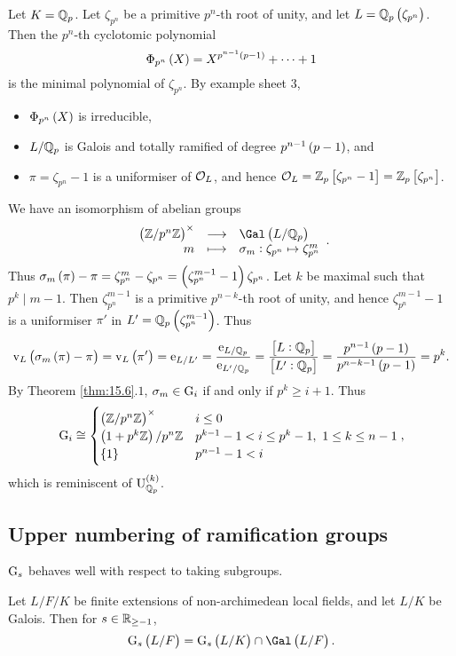 \begin{example*}
Let $ K = \mathbb{Q}_p $. Let $ \zeta_{p^n} $ be a primitive $ p^n $-th root of unity, and let $ L = \QQ_p\br{\zeta_{p^n}} $. Then the $ p^n $-th cyclotomic polynomial
$$ \Phi_{p^n}\br{X} = X^{p^{n - 1}\br{p - 1}} + \dots + 1 $$
is the minimal polynomial of $ \zeta_{p^n} $. By example sheet $ 3 $,
\begin{itemize}
\item $ \Phi_{p^n}\br{X} $ is irreducible,
\item $ L / \mathbb{Q}_p $ is Galois and totally ramified of degree $ p^{n - 1}\br{p - 1} $, and
\item $ \pi = \zeta_{p^n} - 1 $ is a uniformiser of $ \mathcal{O}_L $, and hence $ \OOO_L = \ZZ_p\sbr{\zeta_{p^n} - 1} = \ZZ_p\sbr{\zeta_{p^n}} $.
\end{itemize}
We have an isomorphism of abelian groups
$$ \function{\br{\ZZ / p^n\ZZ}^\times}{\Gal\br{L / \QQ_p}}{m}{\sigma_m : \zeta_{p^n} \mapsto \zeta_{p^n}^m}. $$
Thus $ \sigma_m\br{\pi} - \pi = \zeta_{p^n}^m - \zeta_{p^n} = \br{\zeta_{p^n}^{m - 1} - 1}\zeta_{p^n} $. Let $ k $ be maximal such that $ p^k \mid m - 1 $. Then $ \zeta_{p^n}^{m - 1} $ is a primitive $ p^{n - k} $-th root of unity, and hence $ \zeta_{p^n}^{m - 1} - 1 $ is a uniformiser $ \pi' $ in $ L' = \QQ_p\br{\zeta_{p^n}^{m - 1}} $. Thus
$$ \v_L\br{\sigma_m\br{\pi} - \pi} = \v_L\br{\pi'} = \e_{L / L'} = \dfrac{\e_{L / \QQ_p}}{\e_{L' / \QQ_p}} = \dfrac{\sbr{L : \QQ_p}}{\sbr{L' : \QQ_p}} = \dfrac{p^{n - 1}\br{p - 1}}{p^{n - k - 1}\br{p - 1}} = p^k. $$
By Theorem \ref{thm:15.6}.$ 1 $, $ \sigma_m \in \mathrm{G}_i $ if and only if $ p^k \ge i + 1 $. Thus
$$ \G_i \cong
\begin{cases}
\br{\ZZ / p^n\ZZ}^\times & i \le 0 \\
\br{1 + p^k\ZZ} / p^n\ZZ & p^{k - 1} - 1 < i \le p^k - 1, \ 1 \le k \le n - 1 \\
\cbr{1} & p^{n - 1} - 1 < i
\end{cases},
$$
which is reminiscent of $ \U_{\QQ_p}^{\br{k}} $.
\end{example*}

\subsection{Upper numbering of ramification groups}

$ \mathrm{G}_s $ behaves well with respect to taking subgroups.

\begin{proposition}
\label{prop:16.3}
Let $ L / F / K $ be finite extensions of non-archimedean local fields, and let $ L / K $ be Galois. Then for $ s \in \mathbb{R}_{\ge -1} $,
$$ \G_s\br{L / F} = \G_s\br{L / K} \cap \Gal\br{L / F}. $$
\end{proposition}

